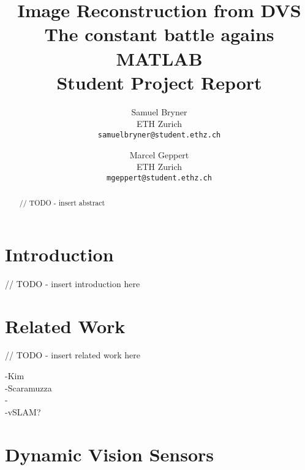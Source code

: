 \documentclass[10pt,twocolumn,letterpaper]{article}
\begin{document}
\title{Image Reconstruction from DVS\\ The constant battle agains MATLAB\\ Student Project Report}

\author{Samuel Bryner\\
ETH Zurich\\
{\tt\small samuelbryner@student.ethz.ch}
\and
Marcel Geppert\\
ETH Zurich\\
{\tt\small mgeppert@student.ethz.ch}
}

\maketitle

\begin{abstract}

// TODO - insert abstract

\end{abstract}

\section{Introduction}

// TODO - insert introduction here

\section{Related Work}

// TODO - insert related work here

-Kim \etal\\
-Scaramuzza\\
-\cite{lpd08dvs}\\
-vSLAM?\\

\section{Dynamic Vision Sensors}
\end{document}
